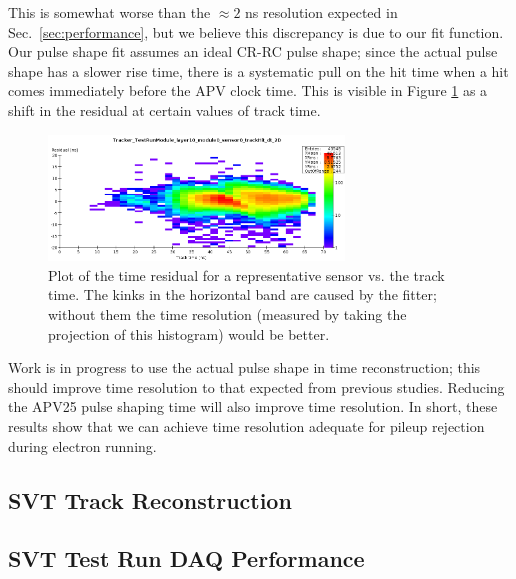This is somewhat worse than the $\approx 2$ ns resolution expected 
in 
Sec.~\ref{sec:performance}, but we believe this discrepancy is due to our fit function. Our pulse 
shape fit assumes an ideal CR-RC pulse shape; since the actual pulse shape has a slower rise time, 
there is a systematic pull on the hit time when a hit comes immediately before the APV clock time. 
This is visible in Figure \ref{fig:timeres_2D} as a shift in the residual at certain values of track time.
\begin{figure}[h]
	\includegraphics[width=0.7\textwidth]{test2012/svtperformance/timeres_2D}
	\caption{\small{Plot of the time residual for a representative sensor vs. the track time. 
		The kinks in the horizontal band are caused by the fitter; without them the time resolution (measured by taking the projection of this histogram) would be better.} }
	\label{fig:timeres_2D}
\end{figure}
Work is in progress to use the actual pulse shape in time reconstruction; this should improve time resolution to that expected from previous studies. 
Reducing the APV25 pulse shaping time will also improve time resolution.
In short, these results show that we can achieve time resolution adequate for pileup rejection during electron running.


\subsection*{SVT Track Reconstruction}


\subsection*{SVT Test Run DAQ Performance}


